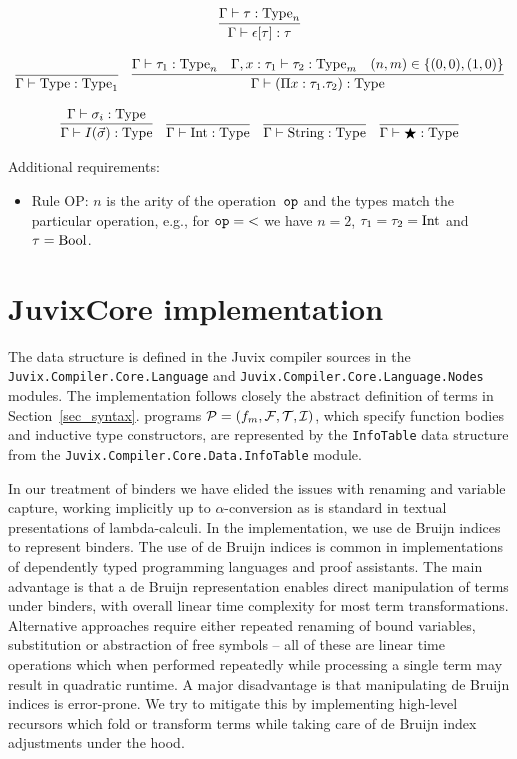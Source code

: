 \documentclass[
    9pt,            %
    techreport,        %
    affiltop,       %
]{art}
\begin{document}
\[\begin{array}{c}
\\ \\
\infer{\Gamma \proves \epsilon[\tau] : \tau}{\Gamma \proves \tau : \Type_n}
\\ \\
\infer{\Gamma \proves \Type : \Type_1}{}\quad
\infer{\Gamma \proves (\Pi x : \tau_1 . \tau_2) : \Type}{\Gamma \proves \tau_1 : \Type_n & \Gamma, x : \tau_1 \proves \tau_2 : \Type_m & (n,m) \in \{(0,0), (1,0)\}}
\\ \\
\infer{\Gamma \proves I(\vec{\sigma}) : \Type}{\Gamma \proves \sigma_i : \Type}\quad
\infer{\Gamma \proves \Int : \Type}{}\quad
\infer{\Gamma \proves \String : \Type}{}\quad
\infer{\Gamma \proves \Dynamic : \Type}{}
\end{array}
\]

Additional requirements:
\begin{itemize}
\item Rule OP: $n$ is the arity of the operation~$\mathtt{op}$ and the types match the particular operation, e.g., for $\mathtt{op} = {<}$ we have $n=2$, $\tau_1=\tau_2=\mathrm{Int}$ and $\tau=\mathrm{Bool}$.
\end{itemize}

\section{JuvixCore implementation}\label{sec_core_implementation}

The \JuvixCore{} data structure is defined in the Juvix compiler sources in the \texttt{Juvix.Compiler.Core.Language} and \texttt{Juvix.Compiler.Core.Language.Nodes} modules. The implementation follows closely the abstract definition of terms in Section~\ref{sec_syntax}. \JuvixCore{} programs $\mathcal{P} = (f_m,\mathcal{F},\mathcal{T},\mathcal{I})$, which specify function bodies and inductive type constructors, are represented by the \texttt{InfoTable} data structure from the \texttt{Juvix.Compiler.Core.Data.InfoTable} module.

In our treatment of binders we have elided the issues with renaming and variable capture, working implicitly up to $\alpha$-conversion as is standard in textual presentations of lambda-calculi. In the implementation, we use de Bruijn indices to represent binders. The use of de Bruijn indices is common in implementations of dependently typed programming languages and proof assistants. The main advantage is that a de Bruijn representation enables direct manipulation of terms under binders, with overall linear time complexity for most term transformations. Alternative approaches require either repeated renaming of bound variables, substitution or abstraction of free symbols -- all of these are linear time operations which when performed repeatedly while processing a single term may result in quadratic runtime. A major disadvantage is that manipulating de Bruijn indices is error-prone. We try to mitigate this by implementing high-level recursors which fold or transform \JuvixCore{} terms while taking care of de Bruijn index adjustments under the hood.
\end{document}
